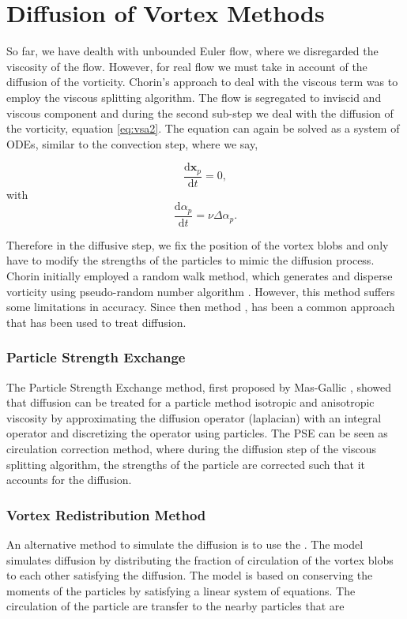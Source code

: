 \section{Diffusion of Vortex Methods}
\label{sec:diffusionVM}

So far, we have dealth with unbounded Euler flow, where we disregarded the viscosity of the flow. However, for real flow we must take in account of the diffusion of the vorticity. Chorin's approach to deal with the viscous term was to employ the viscous splitting algorithm. The flow is segregated to inviscid and viscous component and during the second sub-step we deal with the diffusion of the vorticity, equation \ref{eq:vsa2}. The equation can again be solved as a system of ODEs, similar to the convection step, where we say,

	\begin{equation}
	\frac{\mathrm{d}\mathbf{x}_p}{\mathrm{d}t} = 0,
	\end{equation}
with
	\begin{equation}
	\frac{\mathrm{d}\alpha_p}{\mathrm{d}t} = \nu\Delta\alpha_p.
	\end{equation}

Therefore in the diffusive step, we fix the position of the vortex blobs and only have to modify the strengths of the particles to mimic the diffusion process. Chorin initially employed a random walk method, which generates and disperse vorticity using pseudo-random number algorithm \cite{Chorin1973}. However, this method suffers some limitations in accuracy. Since then  method \cite{Degond1989}, has been a common approach that has been used to treat diffusion.

\subsubsection*{Particle Strength Exchange}
The Particle Strength Exchange method, first proposed by Mas-Gallic \cite{Degond1989}, showed that diffusion can be treated for a particle method isotropic and anisotropic viscosity by approximating the diffusion operator (laplacian) with an integral operator and discretizing the operator using particles. The PSE can be seen as circulation correction method, where during the diffusion step of the viscous splitting algorithm, the strengths of the particle are corrected such that it accounts for the diffusion.
 
\subsubsection*{Vortex Redistribution Method}
An alternative method to simulate the diffusion is to use the  \cite{Shankar1996}. The model simulates diffusion by distributing the fraction of circulation of the vortex blobs to each other satisfying the diffusion. The model is based on conserving the moments of the particles by satisfying a linear system of equations. The circulation of the particle are transfer to the nearby particles that are 

